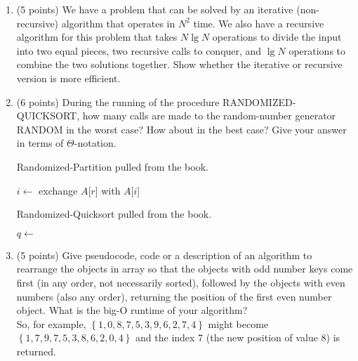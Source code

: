 \documentclass[12pt]{report}
\begin{document}
\maketitle

\begin{enumerate}[label=\arabic*.]
	\item (5 points) We have a problem that can be solved by an iterative (non-recursive) algorithm that operates in $N^{2}$ time. We also have a recursive algorithm for this problem that takes $N \lg N$ operations to divide the input into two equal pieces, two recursive calls to conquer, and $\lg N$ operations to combine the two solutions together. Show whether the iterative or recursive version is more efficient.
	\item (6 points) During the running of the procedure RANDOMIZED-QUICKSORT, how many calls are made to the random-number generator RANDOM in the worst case? How about in the best case? Give your answer in terms of $\Theta$-notation.\begin{algorithm}[H]
		\caption{Randomized-Partition pulled from the book.}\label{alg:randomized-partition}
		\begin{algorithmic}[1]
			\State $i \gets$ 
			\State exchange $A$[$r$] with $A$[$i$]
			\State \Return {}
		\EndFunction
		\end{algorithmic}
	\end{algorithm}\begin{algorithm}[H]
			\caption{Randomized-Quicksort pulled from the book.}\label{alg:randomized-quicksort}
			\begin{algorithmic}[1]
					\State $q \gets $ 
					\State {}
					\State {}
				\EndIf
			\EndFunction
			\end{algorithmic}
		\end{algorithm}
	\item (5 points) Give pseudocode, code or a description of an algorithm to rearrange the objects in array so that the objects with odd number keys come first (in any order, not necessarily sorted), followed by the objects with even numbers (also any order), returning the position of the first even number object. What is the big-O runtime of your algorithm? \\
	So, for example, $\left\{1,0,8,7,5,3,9,6,2,7,4\right\}$ might become $\left\{1,7,9,7,5,3,8,6,2,0,4\right\}$ and the index 7 (the new position of value 8) is returned.

\end{enumerate}
\end{document}
